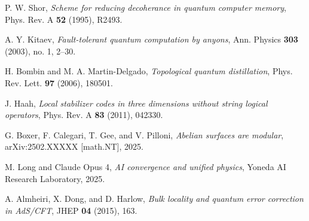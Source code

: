 \documentclass[12pt,a4paper]{article}
\begin{document}

\begin{thebibliography}{99}

P. W. Shor,
\textit{Scheme for reducing decoherance in quantum computer memory},
Phys. Rev. A \textbf{52} (1995), R2493.

A. Y. Kitaev,
\textit{Fault-tolerant quantum computation by anyons},
Ann. Physics \textbf{303} (2003), no. 1, 2--30.

H. Bombin and M. A. Martin-Delgado,
\textit{Topological quantum distillation},
Phys. Rev. Lett. \textbf{97} (2006), 180501.

J. Haah,
\textit{Local stabilizer codes in three dimensions without string logical operators},
Phys. Rev. A \textbf{83} (2011), 042330.

G. Boxer, F. Calegari, T. Gee, and V. Pilloni,
\textit{Abelian surfaces are modular},
arXiv:2502.XXXXX [math.NT], 2025.

M. Long and Claude Opus 4,
\textit{AI convergence and unified physics},
Yoneda AI Research Laboratory, 2025.

A. Almheiri, X. Dong, and D. Harlow,
\textit{Bulk locality and quantum error correction in AdS/CFT},
JHEP \textbf{04} (2015), 163.

\end{thebibliography}
\end{document}
